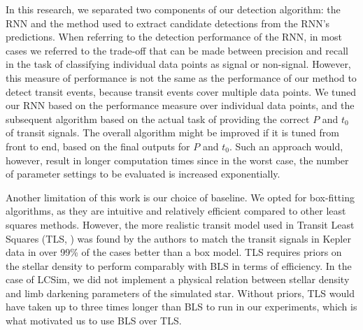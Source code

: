 In this research, we separated two components of our detection algorithm: the RNN and the method used to extract candidate detections from the RNN's predictions. When referring to the detection performance of the RNN, in most cases we referred to the trade-off that can be made between precision and recall in the task of classifying individual data points as signal or non-signal. However, this measure of performance is not the same as the performance of our method to detect transit events, because transit events cover multiple data points. We tuned our RNN based on the performance measure over individual data points, and the subsequent algorithm based on the actual task of providing the correct $P$ and $t_0$ of transit signals. The overall algorithm might be improved if it is tuned from front to end, based on the final outputs for $P$ and $t_0$. Such an approach would, however, result in longer computation times since in the worst case, the number of parameter settings to be evaluated is increased exponentially.

Another limitation of this work is our choice of baseline. We opted for box-fitting algorithms, as they are intuitive and relatively efficient compared to other least squares methods. However, the more realistic transit model used in Transit Least Squares (TLS, \cite{hippke2019optimized}) was found by the authors to match the transit signals in Kepler data in over 99\% of the cases better than a box model. TLS requires priors on the stellar density to perform comparably with BLS in terms of efficiency. In the case of LCSim, we did not implement a physical relation between stellar density and limb darkening parameters of the simulated star. Without priors, TLS would have taken up to three times longer than BLS to run in our experiments, which is what motivated us to use BLS over TLS. 

